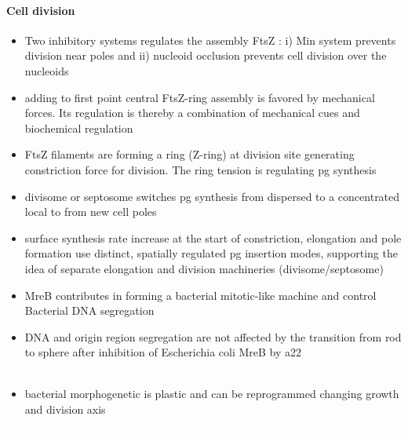 \documentclass{article}
\newcommand{\todo}[1]{\colorbox{WildStrawberry}{\textcolor{white}{#1}}}
\begin{document}
\paragraph{Cell division}
\begin{itemize}
    \item \cite{Bramkamp2009} Two inhibitory systems regulates the assembly FtsZ \cite{Oliva2004}: i) Min system prevents division near poles and ii) nucleoid occlusion prevents cell division over the nucleoids
    \item adding to first point \cite{Koch1995} \cite{Chatterjee1988} central FtsZ-ring assembly is favored by mechanical forces. Its regulation is thereby a combination of mechanical cues and biochemical regulation
    \item FtsZ filaments are forming a ring (Z-ring) at division site \cite{Li2007} generating constriction force for division. The ring tension is regulating \ac{pg} synthesis \cite{Lan2007}
    \item \cite{DenBlaauwen2008} divisome or septosome switches \ac{pg} synthesis from dispersed to a concentrated local to from new cell poles
    \item \cite{Woldringh1987} \cite{Cooper1991} surface synthesis rate increase at the start of constriction, elongation and pole formation use distinct, spatially regulated \ac{pg} insertion modes, supporting the idea of separate elongation and division machineries (divisome/septosome)
    \item \cite{Kruse2005} \cite{Gitai2005} MreB contributes in forming a bacterial mitotic-like machine and control Bacterial DNA segregation
    \item \cite{Karczmarek2007} DNA and origin region segregation are not affected by the transition from rod to sphere after inhibition of Escherichia coli MreB by \ac{a22} \todo{do we really need this extra information?}
    \item \cite{denBlaauwen2018} bacterial morphogenetic is plastic and can be reprogrammed changing growth and division axis \todo{@toqi do we really need this for modelling EMERGENT phenomena?}
\end{itemize}
\end{document}
